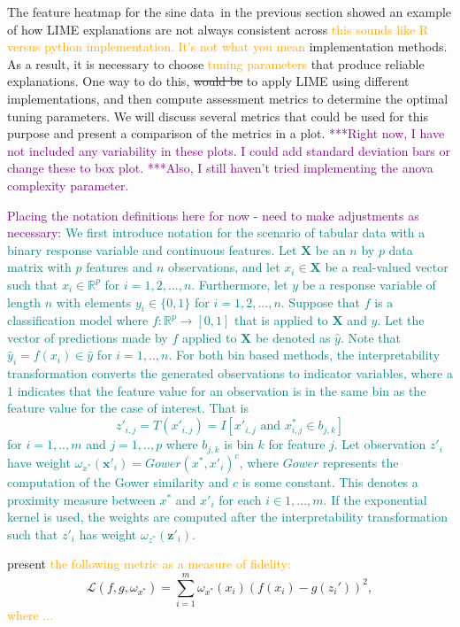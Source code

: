 \documentclass[AMS,STIX2COL]{WileyNJD-v2}\usepackage[]{graphicx}\usepackage[]{color}
\newcommand{\hh}[1]{\textcolor{orange}{#1}}
\newcommand{\kgc}[1]{\textcolor{purple}{#1}}
\newcommand{\kge}[1]{\textcolor{teal}{#1}}
\newcommand{\data}{sine data}
\begin{document}
{The feature heatmap for the \data \ in the previous section showed an example of how LIME explanations are not always consistent across \hh{this sounds like R versus python implementation. It's not what you mean} implementation methods. As a result, it is necessary to choose \hh{tuning parameters} that produce reliable explanations. One way to do this, \sout{would be} to apply LIME using different implementations, and then compute assessment metrics to determine the optimal tuning parameters. We will discuss several metrics that could be used for this purpose and present a comparison of the metrics in a plot. \kgc{***Right now, I have not included any variability in these plots. I could add standard deviation bars or change these to box plot.} \kgc{***Also, I still haven't tried implementing the anova complexity parameter.}

\kgc{Placing the notation definitions here for now - need to make adjustments as necessary:} \kge{We first introduce notation for the scenario of tabular data with a binary response variable and continuous features. Let $\textbf{X}$ be an $n$ by $p$ data matrix with $p$ features and $n$ observations, and let $x_i\in\textbf{X}$ be a real-valued vector such that $x_i\in\mathbb{R}^p$ for $i=1,2,...,n$. Furthermore, let $y$ be a response variable of length $n$ with elements $y_i\in\{0, 1\}$ for $i=1,2,...,n$. Suppose that $f$ is a classification model where $f:\mathbb{R}^p\rightarrow[0,1]$ that is applied to $\textbf{X}$ and $y$. Let the vector of predictions made by $f$ applied to $\textbf{X}$ be denoted as $\hat{y}$. Note that $\hat{y}_i=f(x_i)\in\hat{y}$ for $i=1,..,n$. For both bin based methods, the interpretability transformation converts the generated observations to indicator variables, where a 1 indicates that the feature value for an observation is in the same bin as the feature value for the case of interest. That is
  $$z'_{i,j}=T\left(x'_{i,j}\right) = I\left[x'_{i,j} \mbox{ and } x^*_{i,j}\in b_{j,k} \right]$$
for $i=1,..,m$ and $j=1,..,p$ where $b_{j,k}$ is bin $k$ for feature $j$. Let observation $z'_i$ have weight $\omega_{x^*}(\textbf{x}'_i) = Gower(x^*, x'_i)^c$, where $Gower$ represents the computation of the Gower similarity and $c$ is some constant. This denotes a proximity measure between $x^*$ and $x'_i$ for each $i\in 1,...,m$. If the exponential kernel is used, the weights are computed after the interpretability transformation such that $z'_i$ has weight $\omega_{z^*}(\textbf{z}'_i)$.}

\citet{ribeiro:2016} present \hh{the following metric as a measure of fidelity:}
$$\mathcal{L}(f, g, \omega_{x^*}) = \sum_{i=1}^{m}\omega_{x^*}(x_i)\left(f(x_i)-g\left(z_i'\right)\right)^2,$$
\hh{where  ... }

}
\end{document}
